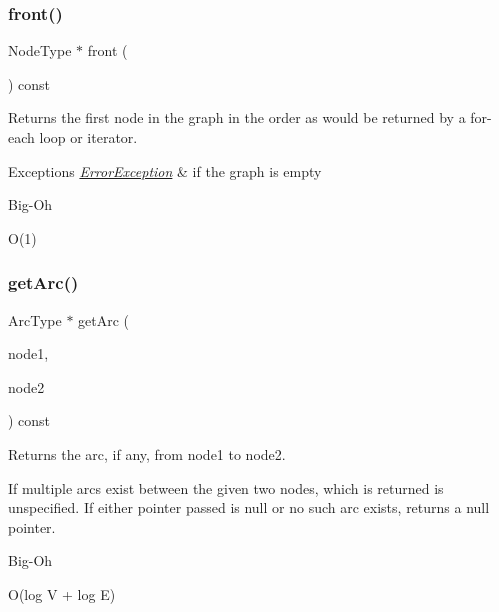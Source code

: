 \subsubsection{\texorpdfstring{front()}{front()}}
{\footnotesize\ttfamily Node\+Type $\ast$ front (\begin{DoxyParamCaption}{ }\end{DoxyParamCaption}) const}



Returns the first node in the graph in the order as would be returned by a for-\/each loop or iterator. 


\begin{DoxyExceptions}{Exceptions}
{\em \mbox{\hyperlink{classErrorException}{Error\+Exception}}} & if the graph is empty \\
\hline
\end{DoxyExceptions}
\begin{DoxyRefDesc}{Big-\/\+Oh}
\item[\mbox{\hyperlink{BigOh__BigOh000059}{Big-\/\+Oh}}]O(1) \end{DoxyRefDesc}
\mbox{\label{classGraph_a7c33db338f839ff9e3dafe4fe61c16fd}} 
\subsubsection{\texorpdfstring{get\+Arc()}{getArc()}\hspace{0.1cm}{\footnotesize\ttfamily [1/2]}}
{\footnotesize\ttfamily Arc\+Type $\ast$ get\+Arc (\begin{DoxyParamCaption}\item[{Node\+Type $\ast$}]{node1,  }\item[{Node\+Type $\ast$}]{node2 }\end{DoxyParamCaption}) const}



Returns the arc, if any, from node1 to node2. 

If multiple arcs exist between the given two nodes, which is returned is unspecified. If either pointer passed is null or no such arc exists, returns a null pointer. \begin{DoxyRefDesc}{Big-\/\+Oh}
\item[\mbox{\hyperlink{BigOh__BigOh000060}{Big-\/\+Oh}}]O(log V + log E) \end{DoxyRefDesc}
\mbox{\label{classGraph_a94d4badfc856b0d4530c37121efb9834}} 
